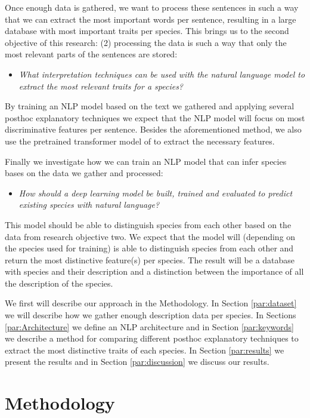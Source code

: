 \documentclass[a4paper, 12pt, oneside]{book} %
\begin{document}
Once enough data is gathered, we want to process these sentences in such a way that we can extract the most important words per sentence, resulting in a large database with most important traits per species.
This brings us to the second objective of this research: (2) processing the data is such a way that only the most relevant parts of the sentences are stored:
\begin{itemize}
    \item \emph{What interpretation techniques can be used with the natural language model to extract the most relevant traits for a species?}
\end{itemize}
By training an NLP model based on the text we gathered and applying several posthoc explanatory techniques we expect that the NLP model will focus on most discriminative features per sentence.
Besides the aforementioned method, we also use the pretrained transformer model of \textcite{wolf_huggingfaces_2020} to extract the necessary features.

Finally we investigate how we can train an NLP model that can infer species bases on the data we gather and processed:
\begin{itemize}
    \item \emph{How should a deep learning model be built, trained and evaluated to predict existing species with natural language?}
\end{itemize}
This model should be able to distinguish species from each other based on the data from research objective two.
We expect that the model will (depending on the species used for training) is able to distinguish species from each other and return the most distinctive feature(s) per species. 
The result will be a database with species and their description and a distinction between the importance of all the description of the species.


We first will describe our approach in the Methodology.
In Section \ref{par:dataset} we will describe how we gather enough description data per species.
In Sections \ref{par:Architecture} we define an NLP architecture and in Section \ref{par:keywords} we describe a method for comparing different posthoc explanatory techniques to extract the most distinctive traits of each species.
In Section \ref{par:results} we present the results and in Section \ref{par:discussion} we discuss our results.

\newpage
\section{Methodology} \label{par:methodoly}
\end{document}
